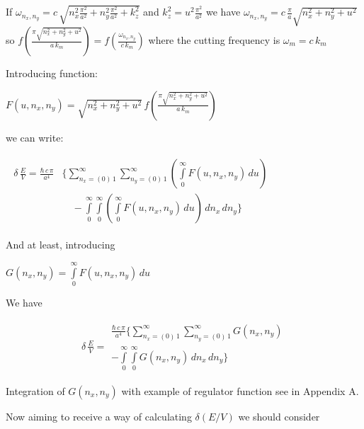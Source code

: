 \documentclass[twoside, 10pt]{article}
\begin{document}
\begin{multicols}{2}


    If
\(\omega _{n_x,n_y} = c\,\sqrt{n_x^2\frac{\pi^2}{a^2}+n_y^2\frac{\pi^2}{a^2}+k_z^2}\)
and \(k_z^2 = u^2 \frac{\pi^2}{a^2}\) we have
\(\omega _{n_x,n_y} = c \, \frac{\pi}{a} \sqrt{n_x^2+n_y^2+u^2}\) so
\(f\left(\frac{\pi\sqrt{n_x^2 + n_y^2+u^2}}{a\,k_m}\right) = f\left(\frac{\omega _{n_x,n_y}}{c\,k_m}\right)\)
where the cutting frequency is \(\omega_m = c\,k_m\)

    Introducing function:

\noindent
$F\left(u, n_x, n_y\right) =
\sqrt{n_x^2 + n_y^2+u^2}\,
f\left(\frac{\pi\sqrt{n_x^2 + n_y^2+u^2}}{a\,k_m}\right)$

    we can write:

\noindent
$\begin{array}{c}
\begin{array}{ll}
\delta\,\frac{E}{V} =
\frac{\hbar\,c\,\pi}{a^4}
&\Bigg\{
\sum\limits_{n_x=\left(0\right)\,1}^{\infty}
\sum\limits_{n_y=\left(0\right)\,1}^{\infty}
\left(\int\limits_{0}^{\infty}F\left(u, n_x, n_y\right)\,d{u}\right)
\\
\, & \,\,\,\,\,\, - \int\limits_{0}^{\infty}
\int\limits_{0}^{\infty}
\left(\int\limits_{0}^{\infty}F\left(u, n_x, n_y\right)\,d{u}\right)
\,d{n_x}\,d{n_y}
\Bigg\}
\end{array}
\end{array}$

    And at least, introducing

    \(
G\left(n_x, n_y\right) = \int\limits_{0}^{\infty}F\left(u, n_x, n_y\right)\,d{u}
\)

    We have

    \begin{equation}
\begin{array}{lr}
\delta\,\frac{E}{V} =
\begin{array}{c}
 \frac{\hbar\,c\,\pi}{a^4} \Bigg\{
\sum\limits_{n_x=\left(0\right)\,1}^{\infty}
\sum\limits_{n_y=\left(0\right)\,1}^{\infty}
G\left(n_x, n_y\right)
\\
- \int\limits_{0}^{\infty}
\int\limits_{0}^{\infty}
G\left(n_x, n_y\right)
\,d{n_x}\,d{n_y}
\Bigg\}
\end{array}
\end{array}
\end{equation}

Integration of \(G\left(n_x, n_y\right)\) with example of regulator
function see in Appendix A.

    Now aiming to receive a way of calculating \(\delta\left(E/V\right)\) we
should consider


\end{multicols}
\end{document}
